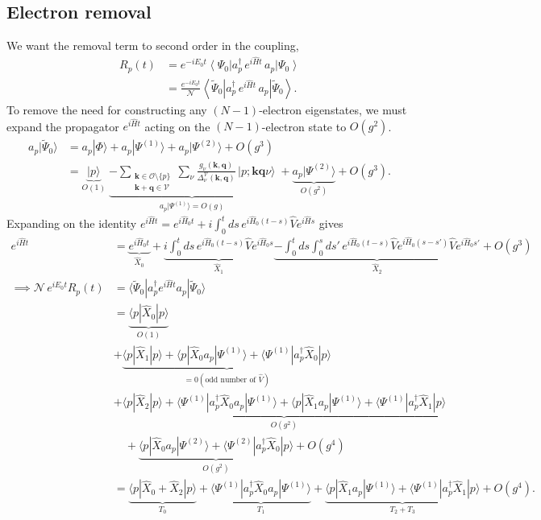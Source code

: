 \subsection{Electron removal}
We want the removal term to second order in the coupling,
\begin{align}
R_p(t)&=e^{-iE_0t}\left\langle\Psi_0\right|a_p^\dagger\,e^{i\hat Ht}\,a_p\left|\Psi_0\right\rangle\\
&=\frac{e^{-iE_0t}}{\mathcal N}\left\langle\tilde\Psi_0\right|a_p^\dagger\,e^{i\hat Ht}\,a_p\left|\tilde\Psi_0\right\rangle.
\end{align}
To remove the need for constructing any $(N-1)$-electron eigenstates, we must expand the propagator $e^{i\hat Ht}$ acting on the $(N-1)$-electron state to $O(g^2)$. 
\begin{align}
a_p|\tilde\Psi_0\rangle
&=a_p|\Phi\rangle+a_p|\Psi^{(1)}\rangle+a_p|\Psi^{(2)}\rangle+O(g^3)\\
&=\underbrace{|p\rangle}_{O(1)}
\;\underbrace{-\sum_{\substack{\bm k\in\mathcal O\setminus\{p\}\\ \bm k+\bm q\in\mathcal V}}\sum_\nu\frac{g_\nu(\bm k,\bm q)}{\Delta^{\mathcal V}_\nu(\bm k,\bm q)}\,|p;\bm k\bm q\nu\rangle}_{a_p|\Psi^{(1)}\rangle=O(g)}
\;+\underbrace{a_p|\Psi^{(2)}\rangle}_{O(g^2)}+O(g^3).
\end{align}
Expanding on the identity $e^{i\hat Ht}=e^{i\hat H_0t}+i\int_0^tds\,e^{i\hat H_0(t-s)}\hat V e^{i\hat Hs}$ gives
\begin{align}
e^{i\hat Ht}&=\underbrace{e^{i\hat H_0t}}_{\hat X_0}+\underbrace{i\int_0^t\!ds\,e^{i\hat H_0(t-s)}\hat V e^{i\hat H_0s}}_{\hat X_1}
\underbrace{-\int_0^t\!ds\int_0^s\!ds'\,e^{i\hat H_0(t-s)}\hat V e^{i\hat H_0(s-s')}\hat V e^{i\hat H_0s'}}_{\hat X_2}+O(g^3)\\
\implies \mathcal N\,e^{iE_0t}R_p(t) &=\langle\tilde\Psi_0|a_p^\dagger e^{i\hat Ht}a_p|\tilde\Psi_0\rangle\\
&=\underbrace{{\langle p|\hat X_0|p\rangle}}_{O(1)}\\
&+\underbrace{{\langle p|\hat X_1|p\rangle} +{\langle p|\hat X_0a_p|\Psi^{(1)}\rangle+\langle\Psi^{(1)}|a_p^\dagger\hat X_0|p\rangle}}_{=0 (\text{odd number of }\hat V)}\\
&+\underbrace{{\langle p|\hat X_2|p\rangle+\langle\Psi^{(1)}|a_p^\dagger\hat X_0a_p|\Psi^{(1)}\rangle+\langle p|\hat X_1a_p|\Psi^{(1)}\rangle+\langle\Psi^{(1)}|a_p^\dagger\hat X_1|p\rangle}}_{O(g^2)}\\
&\quad+\underbrace{\langle p|\hat X_0a_p|\Psi^{(2)}\rangle+\langle\Psi^{(2)}|a_p^\dagger\hat X_0|p\rangle}_{O(g^2)}+O(g^4)\\
&=\underbrace{\langle p|\hat X_0+\hat X_2|p\rangle}_{T_0}
+\underbrace{\langle\Psi^{(1)}|a_p^\dagger\hat X_0a_p|\Psi^{(1)}\rangle}_{T_1} + \underbrace{\langle p|\hat X_1a_p|\Psi^{(1)}\rangle+\langle\Psi^{(1)}|a_p^\dagger\hat X_1|p\rangle}_{T_2+T_3}
+O(g^4).
\end{align}
